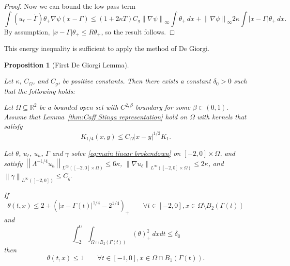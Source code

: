 \documentclass[11pt]{amsart}
\newtheorem{proposition}[theorem]{Proposition}
\theoremstyle{remark}
\theoremstyle{definition}
\newcommand{\R}{\mathbb{R}}
\newcommand{\norm}[1]{\left\lVert#1\right\rVert}
\newcommand{\paren}[1]{\left( #1 \right)}
\newcommand{\bracket}[1]{\left[ #1 \right]}
\newcommand{\grad}{\nabla}
\newcommand{\ulow}{u_\ell}
\newcommand{\uhigh}{u_h}
\newcommand{\Cgamma}{C_g}
\newcommand{\Comega}{C_\Omega}
\begin{document}
\begin{proof}
Now we can bound the low pass term
\[ \int (\ulow - \dot{\Gamma}) \theta_+ \grad\psi(x-\Gamma) \leq (1+2\kappa T) \Cgamma \norm{\grad\psi}_\infty \int \theta_+ \,dx +  \norm{\grad\psi}_\infty 2\kappa \int |x-\Gamma| \theta_+ \,dx. \]
By assumption, $|x-\Gamma| \theta_+ \leq R \theta_+$, so the result follows.  
\end{proof}

This energy inequality is sufficient to apply the method of De Giorgi.  

\begin{proposition}[First De Giorgi Lemma] \label{thm:DG1}

Let $\kappa$, $\Comega$, and $\Cgamma$, be positive constants. Then there exists a constant $\delta_0>0$ such that the following holds:

Let $\Omega \subseteq \R^2$ be a bounded open set with $C^{2,\beta}$ boundary for some $\beta \in (0,1)$.  Assume that Lemma~\ref{thm:Caff Stinga representation} hold on $\Omega$ with kernels that satisfy
\[ K_{1/4}(x,y) \leq \Comega |x-y|^{1/2} K_{1}. \]

Let $\theta$, $\ulow$, $\uhigh$, $\Gamma$ and $\gamma$ solve \eqref{eq:main linear brokendown} on $[-2,0]\times\Omega$, and satisfy $\norm{\Lambda^{-1/4} \uhigh}_{L^\infty([-2,0]\times\Omega)} \leq 6 \kappa$, $\norm{\grad \ulow}_{L^\infty([-2,0]\times\Omega)} \leq 2\kappa$, and $\norm{\dot{\gamma}}_{L^\infty([-2,0])} \leq \Cgamma$.  

If
\[ \theta(t,x) \leq 2 + \paren{|x-\Gamma(t)|^{1/4}-2^{1/4}}_+ \qquad \forall t\in[-2,0], x \in \Omega \setminus B_2(\Gamma(t)) \]
and
\[ \int_{-2}^0 \int_{\Omega\cap B_2(\Gamma(t))} (\theta)_+^2 \,dxdt \leq \delta_0 \]
then
\[ \theta(t,x) \leq 1 \qquad \forall t \in [-1,0], x \in \Omega \cap B_1(\Gamma(t)). \]

\end{proposition}
\end{document}
